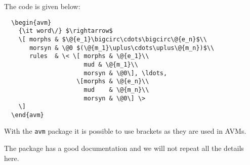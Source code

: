 The code is given below:
\begin{verbatim}
  \begin{avm}
    {\it word\/} $\rightarrow$
    \[ morphs & $\@{e_1}\bigcirc\cdots\bigcirc\@{e_n}$\\
       morsyn & \@0 $(\@{m_1}\uplus\cdots\uplus\@{m_n})$\\
       rules  & \< \[ morphs & \@{e_1}\\
                      mud & \@{m_1}\\ 
                      morsyn & \@0\], \ldots,
                    \[morphs & \@{e_n}\\
                      mud    & \@{m_n}\\ 
                      morsyn & \@0\] \>
    \]
  \end{avm}
\end{verbatim}
With the \texttt{avm} package it is possible to use brackets as they are used in AVMs.

The package has a good documentation and we will not repeat all the details here.






